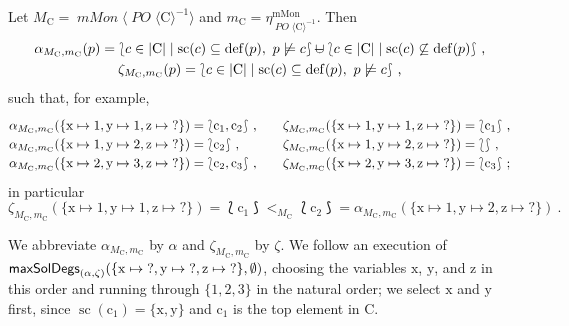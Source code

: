 \documentclass[english]{notes}
\newcommand{\macit}[1]{{\frenchspacing\ensuremath{\normalfont\textsf{#1}}}}
\let\lbagold\lbag
\let\rbagold\rbag
\def\lbag{\mathopen{\lbagold}}
\def\rbag{\mathclose{\rbagold}}
\newcommand{\mcup}{\mathbin{\mathnormal{\cup}\llap{\text{\fontsize{10pt}{10pt}\selectfont$-$}}}}
\newcommand{\category}[1]{\mathrm{#1}}
\newcommand{\mMoncat}{\category{mMon}}
\newcommand{\functor}[1]{\mathit{#1}}
\DeclareMathOperator{\POfun}{\functor{PO}}
\DeclareMathOperator{\mMonfun}{\functor{mMon}}
\newcommand{\mMonfree}[1]{\mMonfun\langle#1\rangle}
\newcommand{\mMoneta}{\eta^{\mMoncat}}
\newcommand{\mMonetaat}[1]{\mMoneta_{#1}}
\newcommand{\POfree}[1]{\POfun\langle#1\rangle}
\DeclareMathOperator{\scope}{\mathrm{sc}}
\DeclareMathOperator{\defdom}{\mathrm{def}}
\begin{document}
\begin{example}
Let $M_{\mathrm{C}} = \mMonfree{\POfree{\mathrm{C}}^{-1}}$ and $m_{\mathrm{C}}
= \mMonetaat{\POfree{\mathrm{C}}^{-1}}$.  Then
%
\begin{gather*}
  \alpha_{M_{\mathrm{C}}, m_{\mathrm{C}}}(p) = \lbag c \in |\mathrm{C}| \mid \scope(c) \subseteq \defdom(p),\ p \not\models c \rbag \mcup \lbag c \in |\mathrm{C}| \mid \scope(c) \not\subseteq \defdom(p) \rbag
\ \text{,}
\\
  \zeta_{M_{\mathrm{C}}, m_{\mathrm{C}}}(p) = \lbag c \in |\mathrm{C}| \mid \scope(c) \subseteq \defdom(p),\ p \not\models c \rbag
\ \text{,}
\end{gather*}
such that, for example,
%
\begin{equation*}
\renewcommand{\arraystretch}{1.2}
\begin{array}[t]{@{}l@{\qquad}l@{}}
  \alpha_{M_{\mathrm{C}}, m_{\mathrm{C}}}(\{ \mathrm{x} \mapsto 1, \mathrm{y} \mapsto 1, \mathrm{z} \mapsto {?} \}) = \lbag \mathrm{c}_1, \mathrm{c}_2 \rbag
\ \text{,}
&
  \zeta_{M_{\mathrm{C}}, m_{\mathrm{C}}}(\{ \mathrm{x} \mapsto 1, \mathrm{y} \mapsto 1, \mathrm{z} \mapsto {?} \}) = \lbag \mathrm{c}_1 \rbag
\ \text{,}
\\
  \alpha_{M_{\mathrm{C}}, m_{\mathrm{C}}}(\{ \mathrm{x} \mapsto 1, \mathrm{y} \mapsto 2, \mathrm{z} \mapsto {?} \}) = \lbag \mathrm{c}_2 \rbag
\ \text{,}
&
  \zeta_{M_{\mathrm{C}}, m_{\mathrm{C}}}(\{ \mathrm{x} \mapsto 1, \mathrm{y} \mapsto 2, \mathrm{z} \mapsto {?} \}) = \lbag \rbag
\ \text{,}
\\
  \alpha_{M_{\mathrm{C}}, m_{\mathrm{C}}}(\{ \mathrm{x} \mapsto 2, \mathrm{y} \mapsto 3, \mathrm{z} \mapsto {?} \}) = \lbag \mathrm{c}_2, \mathrm{c}_3 \rbag
\ \text{,}
&
  \zeta_{M_{\mathrm{C}}, m_{\mathrm{C}}}(\{ \mathrm{x} \mapsto 2, \mathrm{y} \mapsto 3, \mathrm{z} \mapsto {?} \}) = \lbag \mathrm{c}_3 \rbag
\ \text{;}
\end{array}
\end{equation*}
%
in particular
%
\begin{equation*}
  \zeta_{M_{\mathrm{C}}, m_{\mathrm{C}}}(\{ \mathrm{x} \mapsto 1, \mathrm{y} \mapsto 1, \mathrm{z} \mapsto {?} \})
=
  \lbag \mathrm{c}_1 \rbag <_{M_{\mathrm{C}}} \lbag \mathrm{c}_2 \rbag
=
  \alpha_{M_{\mathrm{C}}, m_{\mathrm{C}}}(\{ \mathrm{x} \mapsto 1, \mathrm{y} \mapsto 2, \mathrm{z} \mapsto {?} \})
\ \text{.}
\end{equation*}

We abbreviate $\alpha_{M_{\mathrm{C}}, m_{\mathrm{C}}}$ by $\alpha$
and $\zeta_{M_{\mathrm{C}}, m_{\mathrm{C}}}$ by $\zeta$.  We follow an
execution of $\macit{maxSolDegs}_{(\alpha, \zeta)}(\{ \mathrm{x}
\mapsto {?}, \mathrm{y} \mapsto {?}, \mathrm{z} \mapsto{?} \},
\emptyset)$, choosing the variables $\mathrm{x}$, $\mathrm{y}$, and
$\mathrm{z}$ in this order and running through $\{ 1, 2, 3 \}$ in the
natural order; we select $\mathrm{x}$ and $\mathrm{y}$ first, since
$\scope(\mathrm{c}_1) = \{ \mathrm{x}, \mathrm{y} \}$ and
$\mathrm{c}_1$ is the top element in $\mathrm{C}$.


\end{example}
\end{document}
